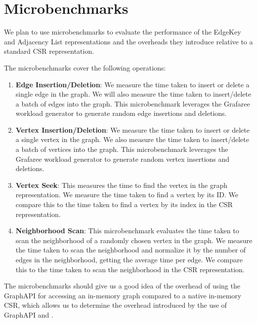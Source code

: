 \section{Microbenchmarks}
\label{eval:microbenchmarks}

We plan to use microbenchmarks to evaluate the performance of the EdgeKey and Adjacency List representations and the overheads they introduce relative to a standard CSR representation.

The microbenchmarks cover the following operations:
\begin{enumerate}
  \item \textbf{Edge Insertion/Deletion}: We measure the time taken to insert or delete a single edge in the graph. We will also measure the time taken to insert/delete a batch of edges into the graph. This microbenchmark leverages the Grafaree workload generator to generate random edge insertions and deletions.
  \item \textbf{Vertex Insertion/Deletion}: We measure the time taken to insert or delete a single vertex in the graph. We also measure the time taken to insert/delete a batch of vertices into the graph. This microbenchmark leverages the Grafaree workload generator to generate random vertex insertions and deletions.
  \item \textbf{Vertex Seek}: This measures the time to find the vertex in the graph representation. We measure the time taken to find a vertex by its ID. We compare this to the time taken to find a vertex by its index in the CSR representation.
  \item \textbf{Neighborhood Scan}: This microbenchmark evaluates the time taken to scan the neighborhood of a randomly chosen vertex in the graph. We measure the time taken to scan the neighborhood and normalize it by the number of edges in the neighborhood, getting the average time per edge. We compare this to the time taken to scan the neighborhood in the CSR representation.
\end{enumerate}

The microbenchmarks should give us a good idea of the overhead of using the GraphAPI for accessing an in-memory graph compared to a native in-memory CSR, which allows us to determine the overhead introduced by the use of GraphAPI and \wt{}. 


